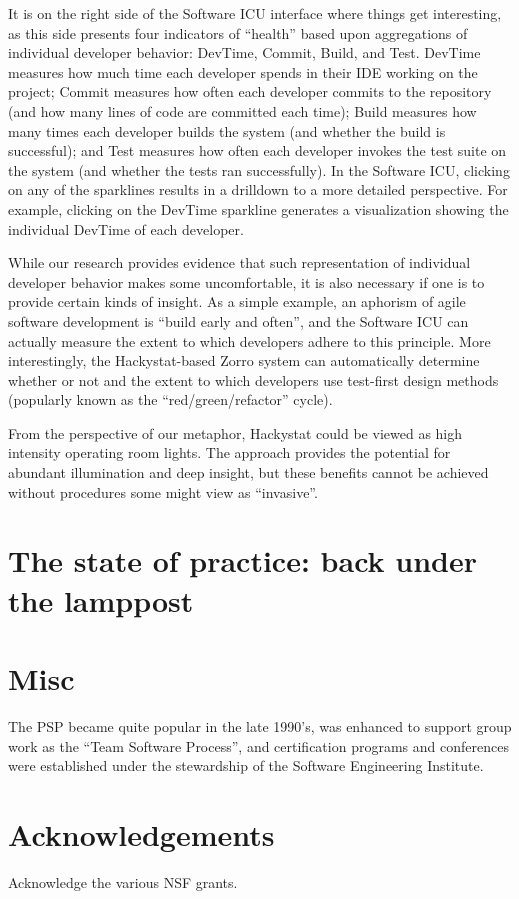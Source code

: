 \documentclass[]{article}
\begin{document}
It is on the right side of the Software ICU interface where things get interesting, as
this side presents four indicators of ``health'' based upon aggregations of individual
developer behavior: DevTime, Commit, Build, and Test.  DevTime measures how much time each
developer spends in their IDE working on the project; Commit measures how often each
developer commits to the repository (and how many lines of code are committed each time);
Build measures how many times each developer builds the system (and whether the build is
successful); and Test measures how often each developer invokes the test suite on the
system (and whether the tests ran successfully).  In the Software ICU, clicking on any of
the sparklines results in a drilldown to a more detailed perspective. For example,
clicking on the DevTime sparkline generates a visualization showing the individual DevTime
of each developer.

While our research provides evidence that such representation of individual developer
behavior makes some uncomfortable, it is also necessary if one is to provide certain kinds
of insight.  As a simple example, an aphorism of agile software development is ``build
early and often'', and the Software ICU can actually measure the extent to which
developers adhere to this principle.  More interestingly, the Hackystat-based Zorro system
can automatically determine whether or not and the extent to which developers use
test-first design methods (popularly known as the ``red/green/refactor'' cycle).

From the perspective of our metaphor, Hackystat could be viewed as high intensity
operating room lights. The approach provides the potential for abundant illumination and
deep insight, but these benefits cannot be achieved without procedures some might view as
``invasive''.

\section{The state of practice: back under the lamppost}




\section{Misc}

The PSP became quite popular in the late 1990's, was enhanced to support group work as the
``Team Software Process'', and certification programs and conferences were established
under the stewardship of the Software Engineering Institute.  



\section{Acknowledgements}

Acknowledge the various NSF grants. 



\end{document}
